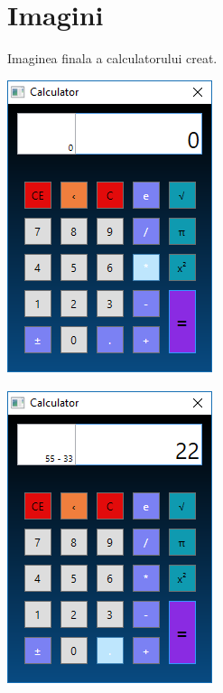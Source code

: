 \section{Imagini}
Imaginea finala a calculatorului creat.
\begin{center}
\includegraphics[scale=1]{images/1}

\end{center}
\begin{center}
\includegraphics[scale=1]{images/2}

\end{center}
\clearpage
